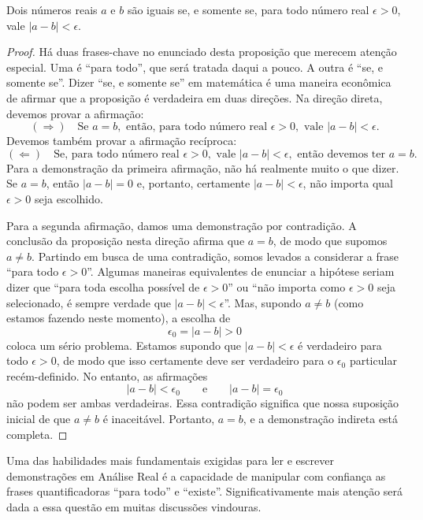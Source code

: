 \begin{theorem}\label{thm:epsilon-igualdade}
Dois números reais $a$ e $b$ são iguais se, e somente se, para todo número real $\epsilon > 0$, vale $|a - b| < \epsilon$.
\end{theorem}

\begin{proof}
Há duas frases-chave no enunciado desta proposição que merecem atenção especial. Uma é ``para todo'', que será tratada daqui a pouco. A outra é ``se, e somente se''. Dizer ``se, e somente se'' em matemática é uma maneira econômica de afirmar que a proposição é verdadeira em duas direções. Na direção direta, devemos provar a afirmação: 
\[
(\Rightarrow) \quad \text{Se } a = b, \text{ então, para todo número real } \epsilon > 0, \text{ vale } |a - b| < \epsilon.
\]
Devemos também provar a afirmação recíproca:
\[
(\Leftarrow) \quad \text{Se, para todo número real } \epsilon > 0, \text{ vale } |a - b| < \epsilon, \text{ então devemos ter } a = b.
\]
Para a demonstração da primeira afirmação, não há realmente muito o que dizer. Se $a = b$, então $|a - b| = 0$ e, portanto, certamente $|a - b| < \epsilon$, não importa qual $\epsilon > 0$ seja escolhido.

Para a segunda afirmação, damos uma demonstração por contradição. A conclusão da proposição nesta direção afirma que $a = b$, de modo que supomos $a \neq b$. Partindo em busca de uma contradição, somos levados a considerar a frase ``para todo $\epsilon > 0$''. Algumas maneiras equivalentes de enunciar a hipótese seriam dizer que ``para toda escolha possível de $\epsilon > 0$'' ou ``não importa como $\epsilon > 0$ seja selecionado, é sempre verdade que $|a - b| < \epsilon$''. Mas, supondo $a \neq b$ (como estamos fazendo neste momento), a escolha de
\[
\epsilon_{0} = |a - b| > 0
\]
coloca um sério problema. Estamos supondo que $|a - b| < \epsilon$ é verdadeiro para todo $\epsilon > 0$, de modo que isso certamente deve ser verdadeiro para o $\epsilon_{0}$ particular recém-definido. No entanto, as afirmações
\[
|a - b| < \epsilon_{0} \qquad \text{e} \qquad |a - b| = \epsilon_{0}
\]
não podem ser ambas verdadeiras. Essa contradição significa que nossa suposição inicial de que $a \neq b$ é inaceitável. Portanto, $a = b$, e a demonstração indireta está completa.
\end{proof}

Uma das habilidades mais fundamentais exigidas para ler e escrever demonstrações em Análise Real é a capacidade de manipular com confiança as frases quantificadoras ``para todo'' e ``existe''. Significativamente mais atenção será dada a essa questão em muitas discussões vindouras.


